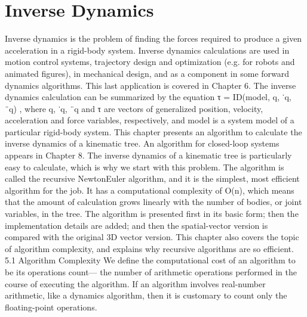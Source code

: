 \chapter{Inverse Dynamics}
\label{chap:5}
Inverse dynamics is the problem of finding the forces required to produce a given acceleration in a rigid-body system. Inverse dynamics calculations are used in motion control systems, trajectory design and optimization (e.g. for robots and animated figures), in mechanical design, and as a component in some forward dynamics algorithms. This last application is covered in Chapter 6. The inverse dynamics calculation can be summarized by the equation τ = ID(model, q, ˙q, ¨q) , where q, ˙q, ¨q and τ are vectors of generalized position, velocity, acceleration and force variables, respectively, and model is a system model of a particular rigid-body system. This chapter presents an algorithm to calculate the inverse dynamics of a kinematic tree. An algorithm for closed-loop systems appears in Chapter 8. The inverse dynamics of a kinematic tree is particularly easy to calculate, which is why we start with this problem. The algorithm is called the recursive NewtonEuler algorithm, and it is the simplest, most efficient algorithm for the job. It has a computational complexity of O(n), which means that the amount of calculation grows linearly with the number of bodies, or joint variables, in the tree. The algorithm is presented first in its basic form; then the implementation details are added; and then the spatial-vector version is compared with the original 3D vector version. This chapter also covers the topic of algorithm complexity, and explains why recursive algorithms are so efficient. 5.1 Algorithm Complexity We define the computational cost of an algorithm to be its operations count— the number of arithmetic operations performed in the course of executing the algorithm. If an algorithm involves real-number arithmetic, like a dynamics algorithm, then it is customary to count only the floating-point operations.

